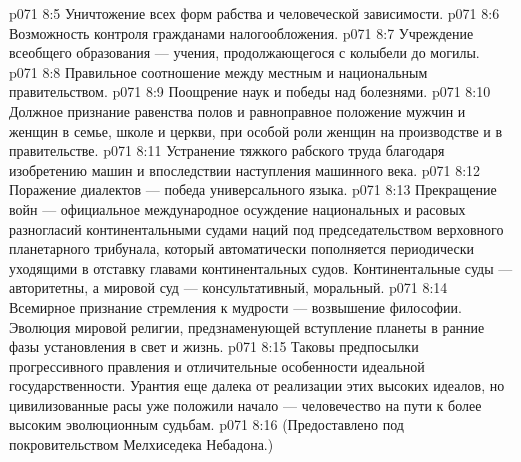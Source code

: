 \vs p071 8:5 \bibnobreakspace Уничтожение всех форм рабства и человеческой зависимости.
\vs p071 8:6 \bibnobreakspace Возможность контроля гражданами налогообложения.
\vs p071 8:7 \bibnobreakspace Учреждение всеобщего образования --- учения, продолжающегося с колыбели до могилы.
\vs p071 8:8 \bibnobreakspace Правильное соотношение между местным и национальным правительством.
\vs p071 8:9 \bibnobreakspace Поощрение наук и победы над болезнями.
\vs p071 8:10 \bibnobreakspace Должное признание равенства полов и равноправное положение мужчин и женщин в семье, школе и церкви, при особой роли женщин на производстве и в правительстве.
\vs p071 8:11 \bibnobreakspace Устранение тяжкого рабского труда благодаря изобретению машин и впоследствии наступления машинного века.
\vs p071 8:12 \bibnobreakspace Поражение диалектов --- победа универсального языка.
\vs p071 8:13 \bibnobreakspace Прекращение войн --- официальное международное осуждение национальных и расовых разногласий континентальными судами наций под председательством верховного планетарного трибунала, который автоматически пополняется периодически уходящими в отставку главами континентальных судов. Континентальные суды --- авторитетны, а мировой суд --- консультативный, моральный.
\vs p071 8:14 \bibnobreakspace Всемирное признание стремления к мудрости --- возвышение философии. Эволюция мировой религии, предзнаменующей вступление планеты в ранние фазы установления в свет и жизнь.
\vs p071 8:15 \pc Таковы предпосылки прогрессивного правления и отличительные особенности идеальной государственности. Урантия еще далека от реализации этих высоких идеалов, но цивилизованные расы уже положили начало --- человечество на пути к более высоким эволюционным судьбам.
\vsetoff
\vs p071 8:16 (Предоставлено под покровительством Мелхиседека Небадона.)
